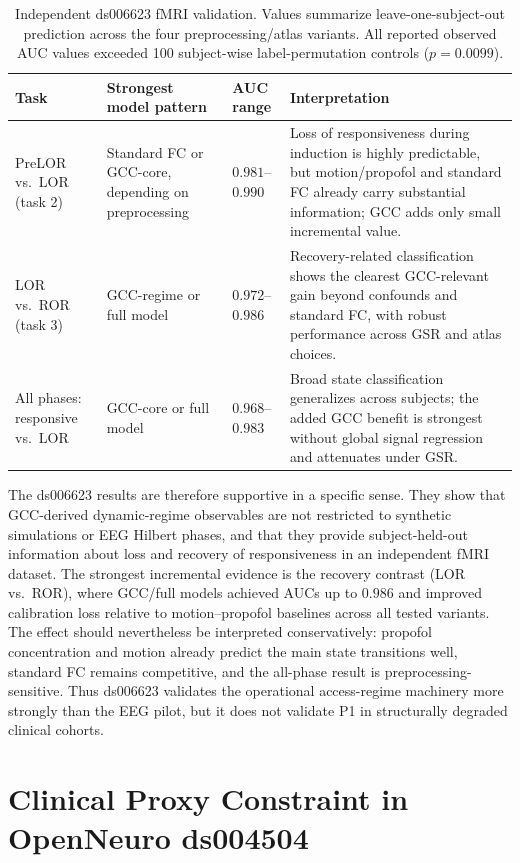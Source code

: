 \documentclass[11pt,a4paper]{article}
\theoremstyle{plain}
\theoremstyle{definition}
\theoremstyle{remark}
\begin{document}
\begin{table}[h]
\centering
\caption{Independent ds006623 fMRI validation. Values summarize leave-one-subject-out prediction across the four preprocessing/atlas variants. All reported observed AUC values exceeded 100 subject-wise label-permutation controls ($p = 0.0099$).}
\label{tab:fmri-validation}
\small
\begin{tabular}{p{3.1cm}p{3.3cm}p{3.1cm}p{4.6cm}}
\hline
Task & Strongest model pattern & AUC range & Interpretation \\
\hline
PreLOR vs.\ LOR (task 2) & Standard FC or GCC-core, depending on preprocessing & $0.981$--$0.990$ & Loss of responsiveness during induction is highly predictable, but motion/propofol and standard FC already carry substantial information; GCC adds only small incremental value. \\
LOR vs.\ ROR (task 3) & GCC-regime or full model & $0.972$--$0.986$ & Recovery-related classification shows the clearest GCC-relevant gain beyond confounds and standard FC, with robust performance across GSR and atlas choices. \\
All phases: responsive vs.\ LOR & GCC-core or full model & $0.968$--$0.983$ & Broad state classification generalizes across subjects; the added GCC benefit is strongest without global signal regression and attenuates under GSR. \\
\hline
\end{tabular}
\end{table}

The ds006623 results are therefore supportive in a specific sense. They show that GCC-derived dynamic-regime observables are not restricted to synthetic simulations or EEG Hilbert phases, and that they provide subject-held-out information about loss and recovery of responsiveness in an independent fMRI dataset. The strongest incremental evidence is the recovery contrast (LOR vs.\ ROR), where GCC/full models achieved AUCs up to $0.986$ and improved calibration loss relative to motion--propofol baselines across all tested variants. The effect should nevertheless be interpreted conservatively: propofol concentration and motion already predict the main state transitions well, standard FC remains competitive, and the all-phase result is preprocessing-sensitive. Thus ds006623 validates the operational access-regime machinery more strongly than the EEG pilot, but it does not validate P1 in structurally degraded clinical cohorts.


\section{Clinical Proxy Constraint in OpenNeuro ds004504}
\label{sec:p1-proxy}
\end{document}
